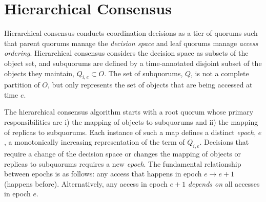 \documentclass[11pt,letterpaper]{article}
\begin{document}


\section{Hierarchical Consensus}
\vspace{-.5em}

Hierarchical consensus conducts coordination decisions as a tier of quorums such that
parent quorums manage the \emph{decision space} and leaf quorums manage \emph{access ordering}.
Hierarchical consensus considers the decision space as subsets of the object set, and
subquorums are defined by a time-annotated disjoint subset of the objects they maintain,
$Q_{i,e} \subset O$.
The set of subquorums, $Q$, is not a complete partition of $O$, but only represents the set of
objects that are being accessed at time $e$.


The hierarchical consensus algorithm starts with a root quorum whose primary
responsibilities are i) the mapping of objects to subquorums and ii) the
mapping of replicas to subquorums.
Each instance of such a map defines a distinct \emph{epoch}, $e$, a
monotonically increasing representation of the term of $Q_{i,e}$.
Decisions that require a change of the decision space or changes the
mapping of objects or replicas to subquorums requires a new \emph{epoch}.
The fundamental relationship between epochs is as follows: any access that
happens in epoch $e \rightarrow e+1$ (happens before).
Alternatively, any access in epoch $e+1$ \emph{depends on} all accesses in
epoch $e$.
\end{document}
